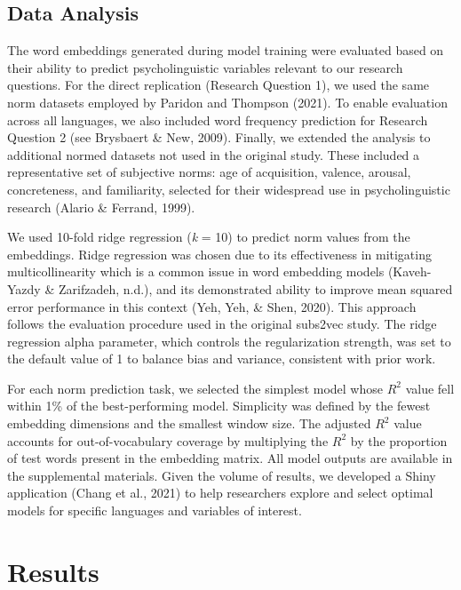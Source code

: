 \documentclass[
  man]{apa6}
\begin{document}
\subsection{Data Analysis}\label{data-analysis}

The word embeddings generated during model training were evaluated based on their ability to predict psycholinguistic variables relevant to our research questions. For the direct replication (Research Question 1), we used the same norm datasets employed by Paridon and Thompson (2021). To enable evaluation across all languages, we also included word frequency prediction for Research Question 2 (see Brysbaert \& New, 2009). Finally, we extended the analysis to additional normed datasets not used in the original study. These included a representative set of subjective norms: age of acquisition, valence, arousal, concreteness, and familiarity, selected for their widespread use in psycholinguistic research (Alario \& Ferrand, 1999).

We used 10-fold ridge regression (\emph{k} = 10) to predict norm values from the embeddings. Ridge regression was chosen due to its effectiveness in mitigating multicollinearity which is a common issue in word embedding models (Kaveh-Yazdy \& Zarifzadeh, n.d.), and its demonstrated ability to improve mean squared error performance in this context (Yeh, Yeh, \& Shen, 2020). This approach follows the evaluation procedure used in the original subs2vec study. The ridge regression alpha parameter, which controls the regularization strength, was set to the default value of 1 to balance bias and variance, consistent with prior work.

For each norm prediction task, we selected the simplest model whose \(R^2\) value fell within 1\% of the best-performing model. Simplicity was defined by the fewest embedding dimensions and the smallest window size. The adjusted \(R^2\) value accounts for out-of-vocabulary coverage by multiplying the \(R^2\) by the proportion of test words present in the embedding matrix. All model outputs are available in the supplemental materials. Given the volume of results, we developed a Shiny application (Chang et al., 2021) to help researchers explore and select optimal models for specific languages and variables of interest.

\section{Results}\label{results}
\end{document}
